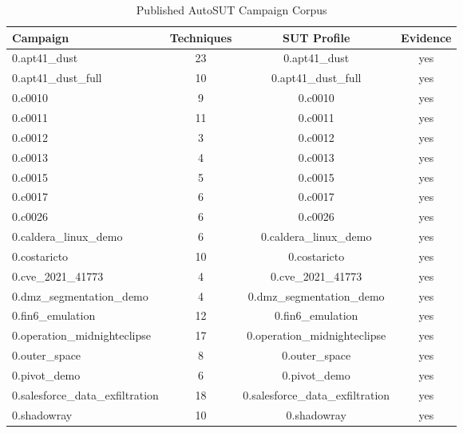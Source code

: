 \begin{table}[htbp]
\centering
\caption{Published AutoSUT Campaign Corpus}
\label{tab:corpus}
\begin{tabular}{lccc}
\toprule
Campaign & Techniques & SUT Profile & Evidence \\
\midrule
0.apt41_dust & 23 & 0.apt41_dust & yes \\
0.apt41_dust_full & 10 & 0.apt41_dust_full & yes \\
0.c0010 & 9 & 0.c0010 & yes \\
0.c0011 & 11 & 0.c0011 & yes \\
0.c0012 & 3 & 0.c0012 & yes \\
0.c0013 & 4 & 0.c0013 & yes \\
0.c0015 & 5 & 0.c0015 & yes \\
0.c0017 & 6 & 0.c0017 & yes \\
0.c0026 & 6 & 0.c0026 & yes \\
0.caldera_linux_demo & 6 & 0.caldera_linux_demo & yes \\
0.costaricto & 10 & 0.costaricto & yes \\
0.cve_2021_41773 & 4 & 0.cve_2021_41773 & yes \\
0.dmz_segmentation_demo & 4 & 0.dmz_segmentation_demo & yes \\
0.fin6_emulation & 12 & 0.fin6_emulation & yes \\
0.operation_midnighteclipse & 17 & 0.operation_midnighteclipse & yes \\
0.outer_space & 8 & 0.outer_space & yes \\
0.pivot_demo & 6 & 0.pivot_demo & yes \\
0.salesforce_data_exfiltration & 18 & 0.salesforce_data_exfiltration & yes \\
0.shadowray & 10 & 0.shadowray & yes \\
\bottomrule
\end{tabular}
\end{table}
